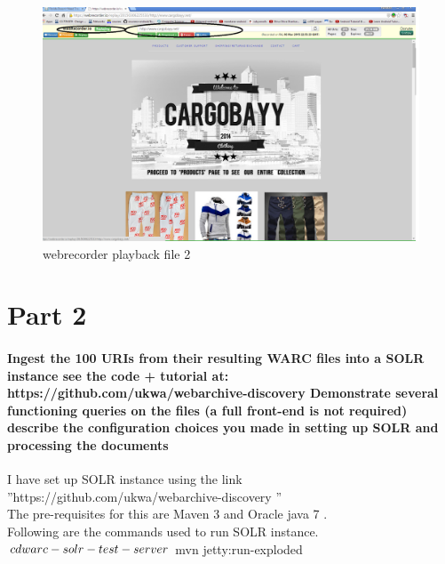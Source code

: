 \documentclass[12pt]{Report}
\begin{document}
\newpage
\begin{figure}[ht]    
    \begin{center}
        \includegraphics[scale=0.60]{webrecorderio-playbackfile2.png}
        \caption{webrecorder playback file 2}
        \label{webrecorder playback}
    \end{center}
\end{figure}
\newpage
  
  
\section{Part 2}

\paragraph{Ingest the 100 URIs from their resulting WARC files into a SOLR instance
see the code + tutorial at: https://github.com/ukwa/webarchive-discovery 
Demonstrate several functioning queries on the files (a full front-end is not required)
describe the configuration choices you made in setting up SOLR and processing the documents\\
}
  
  I have set up SOLR instance using the link ''https://github.com/ukwa/webarchive-discovery '' \\
  
  The pre-requisites for this are Maven 3 and Oracle java 7 .\\
  
  Following are the commands used to run SOLR instance.\\
    $ cd warc-solr-test-server \\
$ mvn jetty:run-exploded \\
\end{document}
